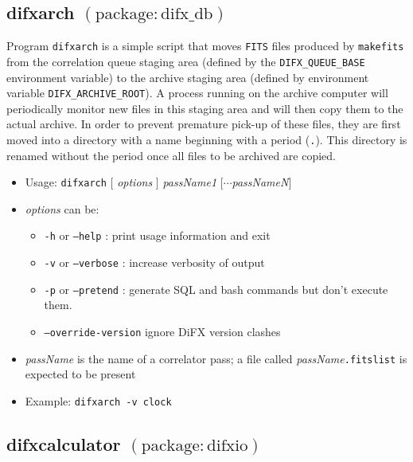 
\subsection{difxarch {\small $\mathrm{(package: difx\_db)}$}} \label{sec:difxarch}

Program {\tt difxarch} is a simple script that moves {\tt FITS} files produced by {\tt makefits} from the correlation queue staging area (defined by the {\tt DIFX\_QUEUE\_BASE} environment variable) to the archive staging area (defined by environment variable {\tt DIFX\_ARCHIVE\_ROOT}).
A process running on the archive computer will periodically monitor new files in this staging area and will then copy them to the actual archive.
In order to prevent premature pick-up of these files, they are first moved into a directory with a name beginning with a period ({\tt .}).
This directory is renamed without the period once all files to be archived are copied.

\begin{itemize}
\item[] Usage: {\tt difxarch} $[$ {\em options} $]$ {\em passName1} $[\cdots${\em passNameN}$]$
\item[] {\em options} can be:
\begin{itemize}
\item[] {\tt -h} or {\tt --help} : print usage information and exit
\item[] {\tt -v} or {\tt --verbose} : increase verbosity of output
\item[] {\tt -p} or {\tt --pretend} : generate SQL and bash commands but don't execute them.
\item[] {\tt --override-version} ignore DiFX version clashes 
\end{itemize}
\item[] {\em passName} is the name of a correlator pass; a file called {\em passName}{\tt .fitslist} is expected to be present
\item[] Example: {\tt difxarch -v clock}
\end{itemize}










\subsection{difxcalculator {\small $\mathrm{(package: difxio)}$}} \label{sec:difxcalculator}

